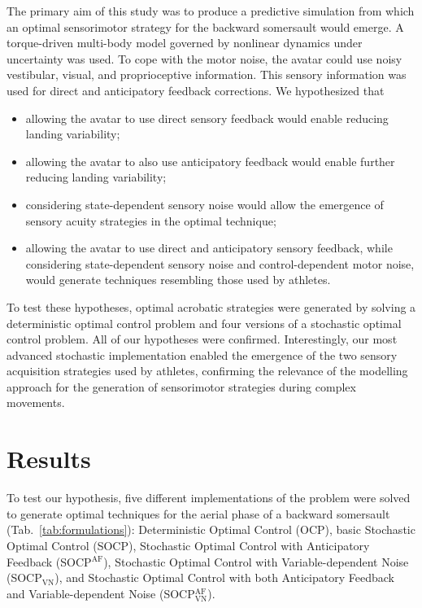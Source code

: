 \documentclass[10pt,letterpaper]{article}
\begin{document}
The primary aim of this study was to produce a predictive simulation from which an optimal sensorimotor strategy for the backward somersault would emerge.
A torque-driven multi-body model governed by nonlinear dynamics under uncertainty was used.
To cope with the motor noise, the avatar could use noisy vestibular, visual, and proprioceptive information. This sensory information was used for direct and anticipatory feedback corrections.
We hypothesized that 
\begin{itemize}
	\item[\textbf{H1}] allowing the avatar to use direct sensory feedback would enable reducing landing variability;
	\item[\textbf{H2}] allowing the avatar to also use anticipatory feedback would enable further reducing landing variability;
	\item[\textbf{H3}] considering state-dependent sensory noise would allow the emergence of sensory acuity strategies in the optimal technique;
	\item[\textbf{H4}] allowing the avatar to use direct and anticipatory sensory feedback, while considering state-dependent sensory noise and control-dependent motor noise, would generate techniques resembling those used by athletes.
\end{itemize}
To test these hypotheses, optimal acrobatic strategies were generated by solving a deterministic optimal control problem and four versions of a stochastic optimal control problem.
All of our hypotheses were confirmed.
Interestingly, our most advanced stochastic implementation enabled the emergence of the two sensory acquisition strategies used by athletes, confirming the relevance of the modelling approach for the generation of sensorimotor strategies during complex movements.
 
 
\section{Results}\label{sec:results}

To test our hypothesis, five different implementations of the problem were solved to generate optimal techniques for the aerial phase of a backward somersault (Tab.~\ref{tab:formulations}): Deterministic Optimal Control (OCP), basic Stochastic Optimal Control (SOCP), Stochastic Optimal Control with Anticipatory Feedback (SOCP$^{\text{AF}}$), Stochastic Optimal Control with Variable-dependent Noise (SOCP$_{\text{VN}}$), and Stochastic Optimal Control with both Anticipatory Feedback and Variable-dependent Noise (SOCP$_{\text{VN}}^{\text{AF}}$).
\end{document}
